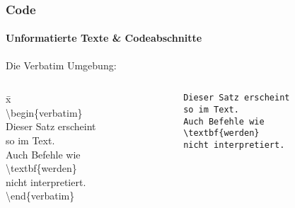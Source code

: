 \begin{frame}[fragile]
\frametitle{Code}
\framesubtitle{Unformatierte Texte \& Codeabschnitte}
Die Verbatim Umgebung:\\
\begin{columns}
\begin{column}{.5\textwidth}
\begin{ttfamily}
\begin{tabbing}
x\=\kill\\
\>\color{unibablueI}\textbackslash begin\color{black}\{verbatim\}\\
\>Dieser Satz erscheint\\
\>so im Text.\\
\>Auch Befehle wie\\
\>\textbackslash textbf\{werden\}\\
\>nicht interpretiert.\\
\>\color{unibablueI}\textbackslash end\color{black}\{verbatim\}\\
\end{tabbing}
\end{ttfamily}

\end{column}
\begin{column}{.5\textwidth}
\begin{verbatim}
Dieser Satz erscheint
so im Text.
Auch Befehle wie
\textbf{werden}
nicht interpretiert.
\end{verbatim}
\end{column}
\end{columns}
\end{frame}


